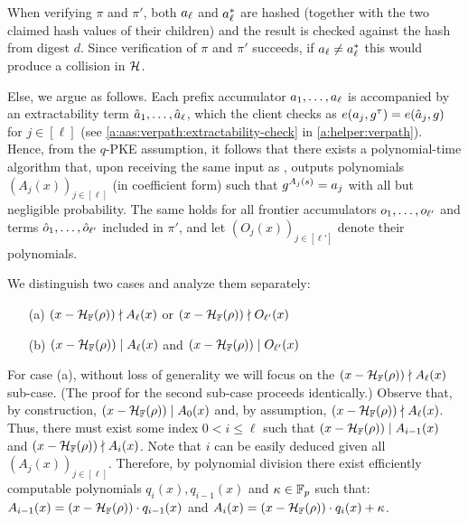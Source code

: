 When verifying $\pi$ and $\pi'$, both $\textcolor{black}{a}_\ell$ and $\textcolor{black}{a}^*_\ell$ are hashed (together with the two claimed hash values of their children) and the result is checked against the hash from digest $d$.
Since verification of $\pi$ and $\pi'$ succeeds, if $\textcolor{black}{a}_\ell \neq \textcolor{black}{a}^*_\ell$ this would produce a collision in $\mathcal{H}$.

Else, we argue as follows.
Each prefix accumulator $\textcolor{black}{a}_1,\dots,\textcolor{black}{a}_\ell$ is accompanied by an extractability term $\textcolor{black}{\hat{a}}_1,\dots,\textcolor{black}{\hat{a}}_\ell$, which the client checks as $e(\textcolor{black}{a}_j,g^\tau)= e(\textcolor{black}{\hat{a}}_j,g)$ for $j\in[\ell]$ (see \cref{a:aas:verpath:extractability-check} in \cref{a:helper:verpath}).
Hence, from the $q$-PKE assumption, it follows that there exists a polynomial-time algorithm that, upon receiving the same input as \Adv, outputs polynomials $(A_j(x))_{j\in[\ell]}$ (in coefficient form) such that $g^{A_j(s)} = \textcolor{black}{a}_j$ with all but negligible probability.
The same holds for all frontier accumulators $o_1,\dots,o_{\ell'}$ and terms $\hat{o}_1,\dots,\hat{o}_{\ell'}$ included in $\pi'$, and let $(O_{j}(x))_{j\in[\ell']}$ denote their polynomials.

We distinguish two cases and analyze them separately:
\begin{itemize}
    \item[(a)] $ (x-\mathcal{H}_{\mathbb{F}}(\rho)) \nmid A_\ell(x)$ or $ (x-\mathcal{H}_{\mathbb{F}}(\rho)) \nmid O_{\ell'}(x)$
    \item[(b)] $ (x-\mathcal{H}_{\mathbb{F}}(\rho)) \;|\; A_\ell(x)$ and $ (x-\mathcal{H}_{\mathbb{F}}(\rho)) \;|\; O_{\ell'}(x)$
\end{itemize}

For case (a), without loss of generality we will focus on the $(x-\mathcal{H}_{\mathbb{F}}(\rho)) \nmid A_\ell(x)$ sub-case.
(The proof for the second sub-case proceeds identically.)
Observe that, by construction, $(x-\mathcal{H}_{\mathbb{F}}(\rho)) \mathrel| A_0(x)$ and, by assumption, $(x-\mathcal{H}_{\mathbb{F}}(\rho)) \nmid A_\ell(x)$.
Thus, there must exist some index $0 < i \le \ell$ such that $(x-\mathcal{H}_{\mathbb{F}}(\rho)) \mathrel| A_{i-1}(x)$ and $(x-\mathcal{H}_{\mathbb{F}}(\rho)) \nmid A_i(x)$.
Note that $i$ can be easily deduced given all  $(A_j(x))_{j\in[\ell]}$.
Therefore, by polynomial division there exist efficiently computable polynomials $q_{i}{(x)},q_{i-1}(x)$ and $\kappa\in \mathbb{F}_p$ such that: $A_{i-1}(x) = (x-\mathcal{H}_{\mathbb{F}}(\rho))\cdot q_{i-1}(x)$ and $A_{i}(x) = (x-\mathcal{H}_{\mathbb{F}}(\rho))\cdot q_{i}(x) + \kappa$.

